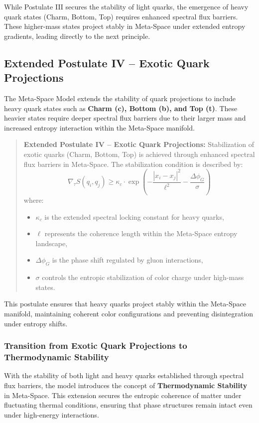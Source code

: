 \documentclass[10.5pt,a4paper]{article}
\begin{document}
While Postulate III secures the stability of light quarks, the emergence of heavy quark states (Charm, Bottom, Top) 
requires enhanced spectral flux barriers. These higher-mass states project stably in Meta-Space under extended 
entropy gradients, leading directly to the next principle.

\subsection{Extended Postulate IV – Exotic Quark Projections}

The Meta-Space Model extends the stability of quark projections to include heavy quark states such as 
\textbf{Charm (c), Bottom (b), and Top (t)}. These heavier states require deeper spectral flux barriers 
due to their larger mass and increased entropy interaction within the Meta-Space manifold.

\begin{quote}
\textbf{Extended Postulate IV – Exotic Quark Projections:}  
Stabilization of exotic quarks (Charm, Bottom, Top) is achieved through enhanced spectral flux barriers in Meta-Space. 
The stabilization condition is described by:
\[
\nabla_\tau S(q_i, q_j) \geq \kappa_c \cdot \exp\left(-\frac{|x_i - x_j|^2}{\ell^2} - \frac{\Delta \phi_G}{\sigma}\right)
\]
where:
\begin{itemize}
    \item \( \kappa_c \) is the extended spectral locking constant for heavy quarks,
    \item \( \ell \) represents the coherence length within the Meta-Space entropy landscape,
    \item \( \Delta \phi_G \) is the phase shift regulated by gluon interactions,
    \item \( \sigma \) controls the entropic stabilization of color charge under high-mass states.
\end{itemize}
\end{quote}

This postulate ensures that heavy quarks project stably within the Meta-Space manifold, maintaining coherent color configurations 
and preventing disintegration under entropy shifts.

\subsubsection*{Transition from Exotic Quark Projections to Thermodynamic Stability}

With the stability of both light and heavy quarks established through spectral flux barriers, 
the model introduces the concept of \textbf{Thermodynamic Stability} in Meta-Space. 
This extension secures the entropic coherence of matter under fluctuating thermal conditions, 
ensuring that phase structures remain intact even under high-energy interactions.
\end{document}
